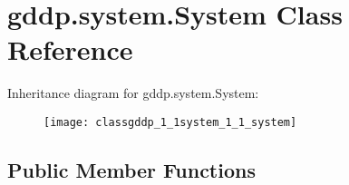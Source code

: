 \hypertarget{classgddp_1_1system_1_1_system}{}\section{gddp.\+system.\+System Class Reference}
\label{classgddp_1_1system_1_1_system}
Inheritance diagram for gddp.\+system.\+System\+:\begin{figure}[H]
\begin{center}
\leavevmode
\texttt{[image: classgddp\_1\_1system\_1\_1\_system]}
\end{center}
\end{figure}
\subsection*{Public Member Functions}
